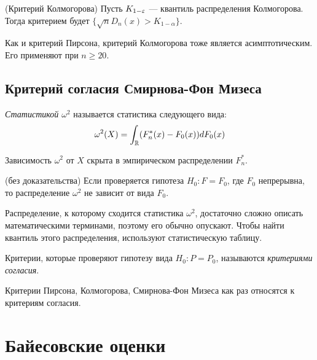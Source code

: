 \begin{solution} (Критерий Колмогорова)
	Пусть $K_{1 - \varepsilon}$ --- квантиль распределения Колмогорова. Тогда критерием будет $\{\sqrt{n}D_n(x) > K_{1 - \alpha}\}$.
\end{solution}

\begin{note}
	Как и критерий Пирсона, критерий Колмогорова тоже является асимптотическим. Его применяют при $n \ge 20$.
\end{note}

\subsection{Критерий согласия Смирнова-Фон Мизеса}

\begin{definition}
	\textit{Статистикой $\omega^2$} называется статистика следующего вида:
	\[
		\omega^2(X) = \int_{\mathbb{R}} (F_n^*(x) - F_0(x))dF_0(x)
	\]
\end{definition}

\begin{anote}
	Зависимость $\omega^2$ от $X$ скрыта в эмпирическом распределении $F_n^*$.
\end{anote}

\begin{theorem} (без доказательства)
	Если проверяется гипотеза $H_0 \colon F = F_0$, где $F_0$ непрерывна, то распределение $\omega^2$ не зависит от вида $F_0$.
\end{theorem}

\begin{anote}
	Распределение, к которому сходится статистика $\omega^2$, достаточно сложно описать математическими терминами, поэтому его обычно опускают. Чтобы найти квантиль этого распределения, используют статистическую таблицу.
\end{anote}

\begin{definition}
	Критерии, которые проверяют гипотезу вида $H_0 \colon P = P_0$, называются \textit{критериями согласия}.
\end{definition}

\begin{note}
	Критерии Пирсона, Колмогорова, Смирнова-Фон Мизеса как раз относятся к критериям согласия.
\end{note}

\section{Байесовские оценки}

